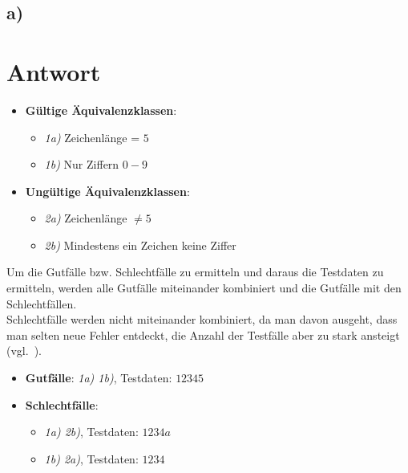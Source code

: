 \subsection*{a)}

\section*{Antwort}

\begin{itemize}
    \item \textbf{Gültige Äquivalenzklassen}:
    \begin{itemize}
        \item \textit{1a)} Zeichenlänge = $5$
        \item \textit{1b)} Nur Ziffern $0-9$
    \end{itemize}
    \item \textbf{Ungültige Äquivalenzklassen}:
    \begin{itemize}
        \item \textit{2a)} Zeichenlänge $\neq 5$
        \item \textit{2b)} Mindestens ein Zeichen keine Ziffer
    \end{itemize}
\end{itemize}

\noindent
Um die Gutfälle bzw. Schlechtfälle zu ermitteln und daraus die Testdaten zu ermitteln, werden alle Gutfälle miteinander kombiniert und die Gutfälle mit den Schlechtfällen.\\
Schlechtfälle werden nicht miteinander kombiniert, da man davon ausgeht, dass man selten neue Fehler entdeckt, die Anzahl der Testfälle aber zu stark ansteigt (vgl.~\cite[44]{Wed09c}).

\begin{itemize}
    \item \textbf{Gutfälle}: \textit{1a) 1b)}, Testdaten: $12345$
    \item \textbf{Schlechtfälle}:
    \begin{itemize}
        \item[] \textit{1a) 2b)}, Testdaten: $1234a$
        \item[] \textit{1b) 2a)}, Testdaten: $1234$
    \end{itemize}
\end{itemize}
